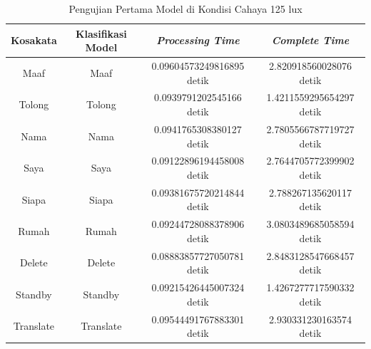 \begin{longtable}{|c|c|c|c|}
  \caption{Pengujian Pertama Model di Kondisi Cahaya 125 lux}
  \label{tb:prediksiterang1}                                   \\
  \hline
  \rowcolor[HTML]{C0C0C0}
  \textbf{Kosakata} & \textbf{Klasifikasi Model} & \textbf{\emph{Processing Time}} & \textbf{\emph{Complete Time}}\\
  \hline
  Maaf              & Maaf                        & 0.09604573249816895 detik                           & 2.820918560028076 detik                                 \\
  Tolong            & Tolong                      & 0.0939791202545166 detik                            & 1.4211559295654297 detik                                  \\
  Nama              & Nama                        & 0.0941765308380127 detik                            & 2.7805566787719727 detik                                  \\
  Saya              & Saya                        & 0.09122896194458008 detik                           & 2.7644705772399902 detik                                  \\
  Siapa             & Siapa                       & 0.09381675720214844 detik                           & 2.788267135620117 detik                                 \\
  Rumah             & Rumah                       & 0.09244728088378906 detik                           & 3.0803489685058594 detik                                  \\
  Delete            & Delete                      & 0.08883857727050781 detik                           & 2.8483128547668457 detik                                  \\
  Standby           & Standby                     & 0.09215426445007324 detik                           & 1.4267277717590332 detik                                  \\
  Translate         & Translate                   & 0.09544491767883301 detik                           & 2.930331230163574 detik                                 \\
  \hline
\end{longtable}

